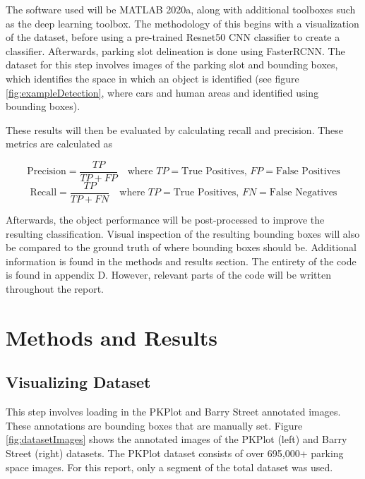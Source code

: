 \documentclass[man]{apa7}
\begin{document}
The software used will be MATLAB 2020a, along with additional toolboxes such as the deep learning toolbox. The methodology of this begins with a visualization of the dataset, before using a pre-trained Resnet50 CNN classifier to create a classifier. Afterwards, parking slot delineation is done using FasterRCNN. The dataset for this step involves images of the parking slot and bounding boxes, which identifies the space in which an object is identified (see figure \ref{fig:exampleDetection}, where cars and human areas and identified using bounding boxes).

These results will then be evaluated by calculating recall and precision. These metrics are calculated as 

\[
\text{Precision} = \frac{TP}{TP + FP} \quad \text{where } TP = \text{True Positives, } FP = \text{False Positives}
\]
\[
\text{Recall} = \frac{TP}{TP + FN} \quad \text{where } TP = \text{True Positives, } FN = \text{False Negatives}
\]

Afterwards, the object performance will be post-processed to improve the resulting classification. Visual inspection of the resulting bounding boxes will also be compared to the ground truth of where bounding boxes should be. Additional information is found in the methods and results section. The entirety of the code is found in appendix D. However, relevant parts of the code will be written throughout the report.

\newpage

\section{Methods and Results}

\subsection{Visualizing Dataset}
This step involves loading in the PKPlot and Barry Street annotated images. These annotations are bounding boxes that are manually set. Figure \ref{fig:datasetImages} shows the annotated images of the PKPlot (left) and Barry Street (right) datasets. The PKPlot dataset consists of over 695,000+ parking space images. For this report, only a segment of the total dataset was used.
\end{document}
